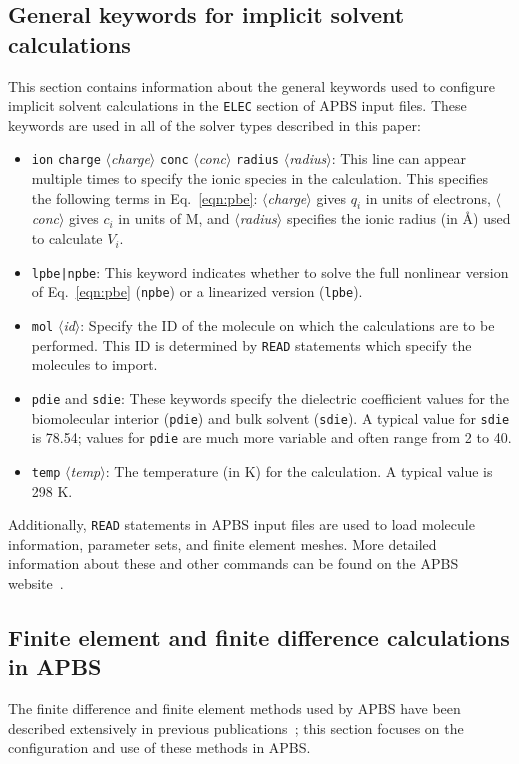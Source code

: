 \documentclass[12pt,titlepage]{article}
\newcommand{\keyword}[1]{\texttt{#1}}
\newcommand{\param}[1]{$\langle$\textit{#1}$\rangle$}
\begin{document}
\subsection{General keywords for implicit solvent calculations} \label{app:general}
This section contains information about the general keywords used to configure implicit solvent calculations in the \keyword{ELEC} section of APBS input files.
These keywords are used in all of the solver types described in this paper:
\begin{itemize}
	\item \keyword{ion} \keyword{charge} \param{charge} \keyword{conc} \param{conc} \keyword{radius} \param{radius}:  This line can appear multiple times to specify the ionic species in the calculation.
	This specifies the following terms in Eq.~\ref{eqn:pbe}: \param{charge} gives $q_i$ in units of electrons, \param{conc} gives $c_i$ in units of M, and \param{radius} specifies the ionic radius (in \AA) used to calculate $V_i$.
	\item \keyword{lpbe|npbe}: This keyword indicates whether to solve the full nonlinear version of Eq.~\ref{eqn:pbe} (\keyword{npbe}) or a linearized version (\keyword{lpbe}).
	\item \keyword{mol} \param{id}:  Specify the ID of the molecule on which the calculations are to be performed.
	This ID is determined by \keyword{READ} statements which specify the molecules to import.
	\item \keyword{pdie} and \keyword{sdie}:  These keywords specify the di\-elec\-tric coefficient values for the bio\-mol\-ec\-ular interior (\keyword{pdie}) and bulk solvent (\keyword{sdie}).
	A typical value for \keyword{sdie} is 78.54; values for \keyword{pdie} are much more variable and often range from 2 to 40.
	\item \keyword{temp} \param{temp}:  The temperature (in K) for the calculation.  A typical value is 298 K.
\end{itemize}
Additionally, \keyword{READ} statements in APBS input files are used to load molecule information, parameter sets, and finite element meshes.
More detailed information about these and other commands can be found on the APBS website~\cite{APBSweb}.

\subsection{Finite element and finite difference calculations in APBS} \label{app:fd}
The finite difference and finite element methods used by APBS have been described extensively in previous publications~\cite{Baker2000, Holst2000, Holst1993, Baker2001, Baker2001a}; this section focuses on the configuration and use of these methods in APBS.
\end{document}
